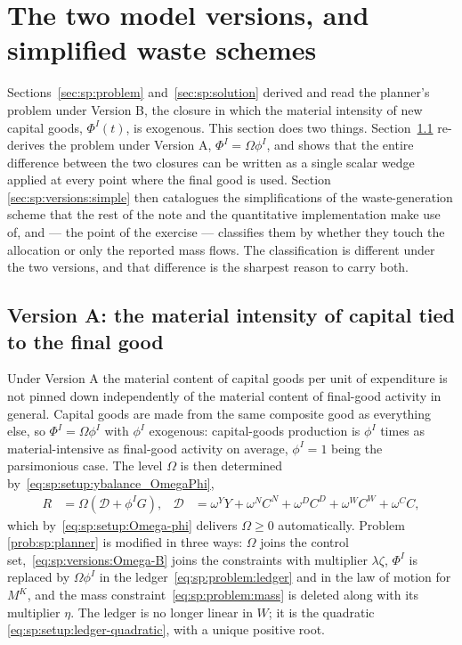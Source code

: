 ﻿\section{The two model versions, and simplified waste schemes}\label{sec:sp:versions}

Sections~\ref{sec:sp:problem} and~\ref{sec:sp:solution} derived and read the planner's problem under
Version B, the closure in which the material intensity of new capital goods, $\Phi^I(t)$, is
exogenous. This section does two things. Section~\ref{sec:sp:versions:A} re-derives the problem under
Version A, $\Phi^I=\Omega\phi^I$, and shows that the entire difference between the two closures can be
written as a single scalar wedge applied at every point where the final good is used. Section
\ref{sec:sp:versions:simple} then catalogues the simplifications of the waste-generation scheme that
the rest of the note and the quantitative implementation make use of, and --- the point of the
exercise --- classifies them by whether they touch the allocation or only the reported mass flows.
The classification is different under the two versions, and that difference is the sharpest reason
to carry both.


\subsection{Version A: the material intensity of capital tied to the final good}
\label{sec:sp:versions:A}

 Under Version A the material content of capital goods per unit of
expenditure is not pinned down independently of the material content of final-good activity in
general. Capital goods are made from the same composite good as everything else, so
$\Phi^I=\Omega\phi^I$ with $\phi^I$ exogenous: capital-goods production is $\phi^I$ times as
material-intensive as final-good activity on average, $\phi^I=1$ being the parsimonious case. The
level $\Omega$ is then determined by~\eqref{eq:sp:setup:ybalance_OmegaPhi},
\begin{align}
R &= \Omega\left(\mathcal D+\phi^IG\right),
&
\mathcal D &= \omega^YY+\omega^{N}C^N+\omega^{D}C^D+\omega^WC^W+\omega^CC,
\label{eq:sp:versions:Omega-B}
\end{align}
which by~\eqref{eq:sp:setup:Omega-phi} delivers $\Omega\ge0$ automatically. Problem
\ref{prob:sp:planner} is modified in three ways: $\Omega$ joins the control
set,~\eqref{eq:sp:versions:Omega-B} joins the constraints with multiplier $\lambda\zeta$, $\Phi^I$ is
replaced by $\Omega\phi^I$ in the ledger~\eqref{eq:sp:problem:ledger} and in the law of motion for
$M^K$, and the mass constraint~\eqref{eq:sp:problem:mass} is deleted along with its multiplier
$\eta$. The ledger is no longer linear in $W$; it is the quadratic
\eqref{eq:sp:setup:ledger-quadratic}, with a unique positive root.

